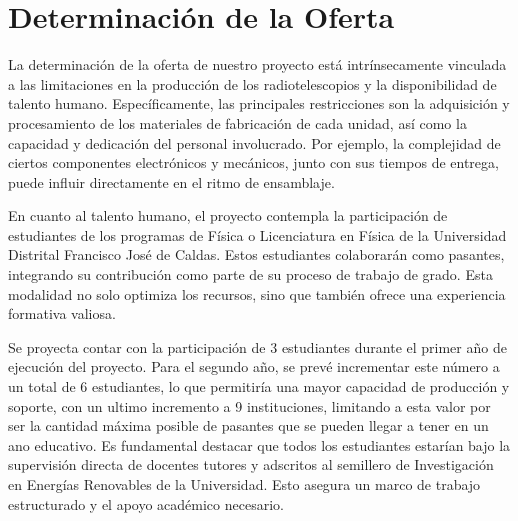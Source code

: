 \section{Determinación de la Oferta}%
\label{sec:Determinación de la Oferta}

La determinación de la oferta de nuestro proyecto está intrínsecamente
vinculada a las limitaciones en la producción de los radiotelescopios y la
disponibilidad de talento humano.
Específicamente, las principales restricciones son la adquisición y
procesamiento de los materiales de fabricación de cada unidad, así como la
capacidad y dedicación del personal involucrado.
Por ejemplo, la complejidad de ciertos componentes electrónicos y mecánicos,
junto con sus tiempos de entrega, puede influir directamente en el ritmo de
ensamblaje.

En cuanto al talento humano, el proyecto contempla la participación de
estudiantes de los programas de Física o Licenciatura en Física de la
Universidad Distrital Francisco José de Caldas.
Estos estudiantes colaborarán como pasantes, integrando su contribución como
parte de su proceso de trabajo de grado.
Esta modalidad no solo optimiza los recursos, sino que también ofrece una
experiencia formativa valiosa.

Se proyecta contar con la participación de 3 estudiantes durante el primer
año de ejecución del proyecto.
Para el segundo año, se prevé incrementar este número a un total de 6
estudiantes, lo que permitiría una mayor capacidad de producción y soporte,
con un ultimo incremento a 9 instituciones, limitando a esta valor por ser
la cantidad máxima posible de pasantes que se pueden llegar a tener en un
ano educativo.
Es fundamental destacar que todos los estudiantes estarían bajo la supervisión
directa de docentes tutores y adscritos al semillero de Investigación en
Energías Renovables de la Universidad.
Esto asegura un marco de trabajo estructurado y el apoyo académico necesario.

